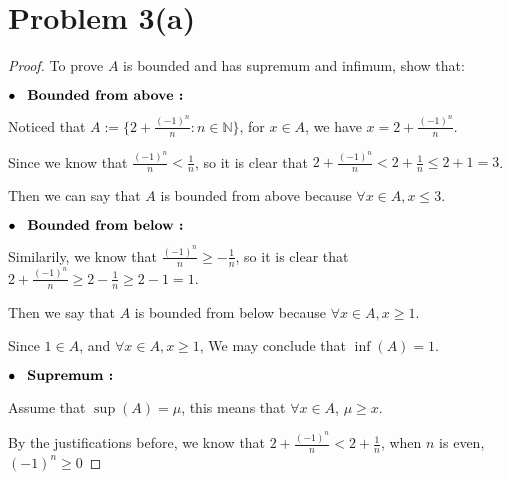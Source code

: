 \documentclass[12pt]{article}
\begin{document}
\doublespacing

\section*{Problem 3(a)}

\begin{proof}
    To prove $A$ is bounded and has supremum and infimum,
    show that:
    
    $\bullet \hspace*{0.3cm}\textbf{Bounded from above
    :}$

    Noticed that $A := \displaystyle{\Big\lbrace 2+
    \frac{(-1)^n}{n} : n
    \in \mathbb{N} \Big\rbrace} $, for $x \in A$, we have
    $ x = 2 + \displaystyle\frac{(-1)^n}{n} $.

    \vspace*{0.3cm}
    Since we know that $ \displaystyle\frac{(-1)^n}{n}
    < \displaystyle\frac{1}{n}$, so it is clear that 
    $ 2 + \displaystyle \frac{(-1)^n}{n} <
    2 + \displaystyle\frac{1}{n} \leq 2+1 = 3$.

    \vspace*{0.3cm}
    Then we can say that $A$ is bounded from above because
    $\forall x \in A, x \leq 3$.
    
    \vspace*{0.3cm}
    $\bullet \hspace*{0.3cm} \textbf{Bounded from below :}$
    
    Similarily, we know that $\displaystyle\frac{(-1)^n}{n}
    \geq - \displaystyle \frac{1}{n}$, so it is clear that
    $ 2+\displaystyle\frac{(-1)^n}{n} \geq 2-\displaystyle
    \frac{1}{n} \geq 2-1 = 1$.

    \vspace*{0.3cm}
    Then we say that $A$ is bounded from below because 
    $\forall x \in A, x \geq 1$.

    \vspace*{0.3cm}
    Since $1 \in A$, and $\forall x \in A, x \geq 1$, We
    may conclude that $\inf(A) = 1$.

    \vspace*{0.3cm}
    $\bullet \hspace*{0.3cm} \textbf{Supremum : }$
    
    Assume that $\sup(A) = \mu$, this means that
    $\forall x \in A$, $\mu \geq x$.

    \vspace*{0.3cm}
    By the justifications before, we know that 
    $2+\displaystyle \frac{(-1)^n}{n} < 2+\displaystyle
    \frac{1}{n}$, when $n$ is even,  $(-1)^n \geq 0$
    

\end{proof}
\end{document}
